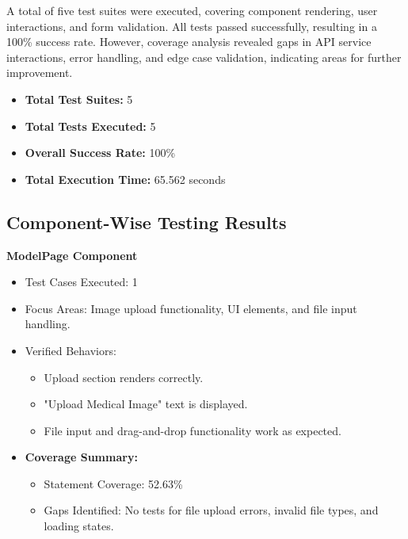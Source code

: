 \documentclass[12pt, titlepage]{article}
\begin{document}
A total of five test suites were executed, covering component rendering, user interactions, and form validation. All tests passed successfully, resulting in a 100\% success rate. However, coverage analysis revealed gaps in API service interactions, error handling, and edge case validation, indicating areas for further improvement.

\begin{itemize}
    \item \textbf{Total Test Suites:} 5
    \item \textbf{Total Tests Executed:} 5
    \item \textbf{Overall Success Rate:} 100\%
    \item \textbf{Total Execution Time:} 65.562 seconds
\end{itemize}

\subsection{Component-Wise Testing Results}

\textbf{ModelPage Component}
\begin{itemize}
    \item Test Cases Executed: 1
    \item Focus Areas: Image upload functionality, UI elements, and file input handling.
    \item Verified Behaviors:
    \begin{itemize}
        \item Upload section renders correctly.
        \item "Upload Medical Image" text is displayed.
        \item File input and drag-and-drop functionality work as expected.
    \end{itemize}
    \item \textbf{Coverage Summary:}
    \begin{itemize}
        \item Statement Coverage: 52.63\%
        \item Gaps Identified: No tests for file upload errors, invalid file types, and loading states.
    \end{itemize}
\end{itemize}
\end{document}
